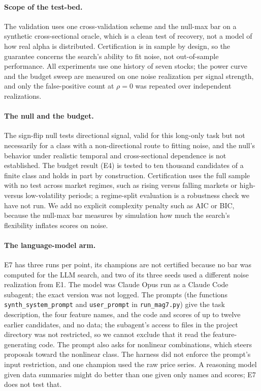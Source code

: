 \documentclass[11pt]{article}
\newcommand{\code}[1]{\texttt{#1}}
\begin{document}
\paragraph{Scope of the test-bed.} The validation uses one cross-validation scheme and the null-max bar
on a synthetic cross-sectional oracle, which is a clean test of recovery, not a model of how real alpha
is distributed. Certification is in sample by design, so the guarantee concerns the search's ability to
fit noise, not out-of-sample performance. All experiments use one history of seven stocks; the power
curve and the budget sweep are measured on one noise realization per signal strength, and only the
false-positive count at $\rho=0$ was repeated over independent realizations.

\paragraph{The null and the budget.} The sign-flip null tests directional signal, valid for this
long-only task but not necessarily for a class with a non-directional route to fitting noise, and the
null's behavior under realistic temporal and cross-sectional dependence is not established. The budget
result (E4) is tested to ten thousand candidates of a finite class and holds in part by construction.
Certification uses the full sample with no test across market regimes, such as rising versus falling
markets or high- versus low-volatility periods; a regime-split evaluation is a robustness check we have
not run. We add no explicit complexity penalty such as AIC or BIC, because the null-max bar measures by
simulation how much the search's flexibility inflates scores on noise.

\paragraph{The language-model arm.} E7 has three runs per point, its champions are not certified because
no bar was computed for the LLM search, and two of its three seeds used a different noise realization
from E1. The model was Claude Opus run as a Claude Code subagent; the exact version was not logged. The
prompts (the functions \code{synth\_system\_prompt} and \code{user\_prompt} in \code{run\_mag7.py}) give the
task description, the four feature names, and the code and scores of up to twelve earlier candidates, and
no data; the subagent's access to files in the project directory was not restricted, so we cannot
exclude that it read the feature-generating code. The prompt also asks for nonlinear combinations, which
steers proposals toward the nonlinear class. The harness did not enforce the prompt's input restriction,
and one champion used the raw price series. A reasoning model given data summaries might do better than
one given only names and scores; E7 does not test that.
\end{document}
